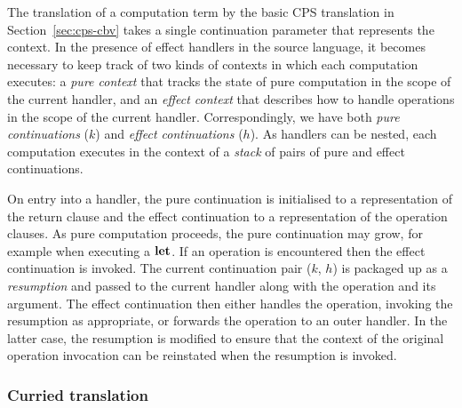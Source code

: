 \documentclass[12pt,phd,lfcs,twoside,openright,logo,leftchapter,normalheadings]{infthesis}
\theoremstyle{plain}
\theoremstyle{definition}
\begin{document}
The translation of a computation term by the basic CPS translation in
Section~\ref{sec:cps-cbv} takes a single continuation parameter that
represents the context.
%
In the presence of effect handlers in the source language, it becomes
necessary to keep track of two kinds of contexts in which each
computation executes: a \emph{pure context} that tracks the state of
pure computation in the scope of the current handler, and an
\emph{effect context} that describes how to handle operations in the
scope of the current handler.
%
Correspondingly, we have both \emph{pure continuations} ($k$) and
\emph{effect continuations} ($h$).
%
As handlers can be nested, each computation executes in the context of
a \emph{stack} of pairs of pure and effect continuations.

On entry into a handler, the pure continuation is initialised to a
representation of the return clause and the effect continuation to a
representation of the operation clauses. As pure computation proceeds,
the pure continuation may grow, for example when executing a
$\mathbf{let}$. If an operation is encountered then the effect continuation is
invoked.
%
The current continuation pair ($k$, $h$) is packaged up as a
\emph{resumption} and passed to the current handler along with the
operation and its argument. The effect continuation then either
handles the operation, invoking the resumption as appropriate, or
forwards the operation to an outer handler. In the latter case, the
resumption is modified to ensure that the context of the original
operation invocation can be reinstated when the resumption is invoked.
%

\subsubsection{Curried translation}
\label{sec:first-order-curried-cps}
\end{document}
